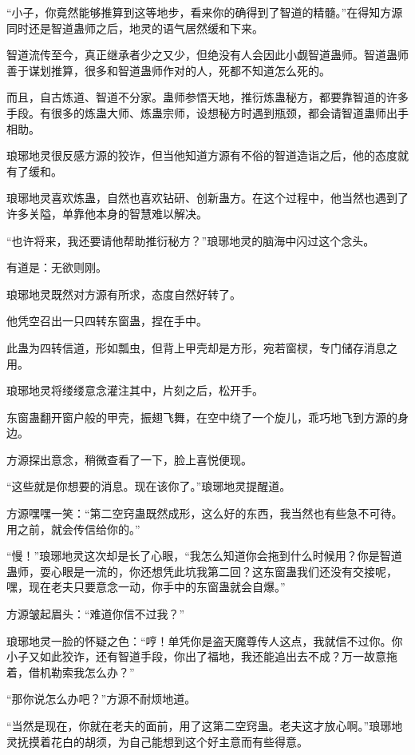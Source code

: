 \begin{this_body}
“小子，你竟然能够推算到这等地步，看来你的确得到了智道的精髓。”在得知方源同时还是智道蛊师之后，地灵的语气居然缓和下来。

智道流传至今，真正继承者少之又少，但绝没有人会因此小觑智道蛊师。智道蛊师善于谋划推算，很多和智道蛊师作对的人，死都不知道怎么死的。

而且，自古炼道、智道不分家。蛊师参悟天地，推衍炼蛊秘方，都要靠智道的许多手段。有很多的炼蛊大师、炼蛊宗师，设想秘方时遇到瓶颈，都会请智道蛊师出手相助。

琅琊地灵很反感方源的狡诈，但当他知道方源有不俗的智道造诣之后，他的态度就有了缓和。

琅琊地灵喜欢炼蛊，自然也喜欢钻研、创新蛊方。在这个过程中，他当然也遇到了许多关隘，单靠他本身的智慧难以解决。

“也许将来，我还要请他帮助推衍秘方？”琅琊地灵的脑海中闪过这个念头。

有道是：无欲则刚。

琅琊地灵既然对方源有所求，态度自然好转了。

他凭空召出一只四转东窗蛊，捏在手中。

此蛊为四转信道，形如瓢虫，但背上甲壳却是方形，宛若窗棂，专门储存消息之用。

琅琊地灵将缕缕意念灌注其中，片刻之后，松开手。

东窗蛊翻开窗户般的甲壳，振翅飞舞，在空中绕了一个旋儿，乖巧地飞到方源的身边。

方源探出意念，稍微查看了一下，脸上喜悦便现。

“这些就是你想要的消息。现在该你了。”琅琊地灵提醒道。

方源嘿嘿一笑：“第二空窍蛊既然成形，这么好的东西，我当然也有些急不可待。用之前，就会传信给你的。”

“慢！”琅琊地灵这次却是长了心眼，“我怎么知道你会拖到什么时候用？你是智道蛊师，耍心眼是一流的，你还想凭此坑我第二回？这东窗蛊我们还没有交接呢，嘿，现在老夫只要意念一动，你手中的东窗蛊就会自爆。”

方源皱起眉头：“难道你信不过我？”

琅琊地灵一脸的怀疑之色：“哼！单凭你是盗天魔尊传人这点，我就信不过你。你小子又如此狡诈，还有智道手段，你出了福地，我还能追出去不成？万一故意拖着，借机勒索我怎么办？”

“那你说怎么办吧？”方源不耐烦地道。

“当然是现在，你就在老夫的面前，用了这第二空窍蛊。老夫这才放心啊。”琅琊地灵抚摸着花白的胡须，为自己能想到这个好主意而有些得意。


\end{this_body}
